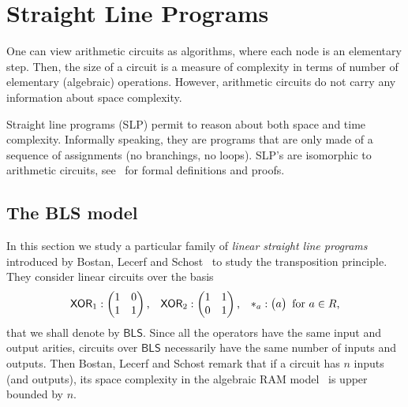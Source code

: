 \section{Straight Line Programs}
\label{sec:stra-line-progr}

One can view arithmetic circuits as algorithms, where each node is an
elementary step. Then, the size of a circuit is a measure of
complexity in terms of number of elementary (algebraic)
operations. However, arithmetic circuits do not carry any information
about space complexity.

Straight line programs
(SLP) permit to reason about
both space and time complexity. Informally speaking, they are programs
that are only made of a sequence of assignments (no branchings, no
loops).  SLP's are isomorphic to arithmetic circuits,
see~\cite{burgisser+clausen-shokrollahi} for formal definitions and
proofs.

\subsection{The BLS model}
\label{sec:bls-model}
In this section we study a particular family of \emph{linear straight
  line programs} introduced by Bostan, Lecerf and
Schost~\cite{bostan+lecerf+schost:tellegen} to study the transposition
principle. They consider linear circuits over the basis
\begin{equation}
  \label{eq:246}
  \mathsf{XOR}_1 :
  \begin{pmatrix}
    1 & 0\\1 & 1
  \end{pmatrix}
  \text{,}\quad
  \mathsf{XOR}_2 :
  \begin{pmatrix}
    1 & 1\\0 & 1
  \end{pmatrix}
  \text{,}\quad
  *_{a} :
  \begin{pmatrix}
    a
  \end{pmatrix}
  \text{ for $a\in R$,}
\end{equation}
that we shall denote by $\mathsf{BLS}$. Since all the operators have
the same input and output arities, circuits over $\mathsf{BLS}$
necessarily have the same number of inputs and outputs. Then Bostan,
Lecerf and Schost remark that if a circuit has $n$ inputs (and
outputs), its space complexity in the algebraic RAM
model~\cite{kaltofen88:gcd} is upper bounded by $n$.

